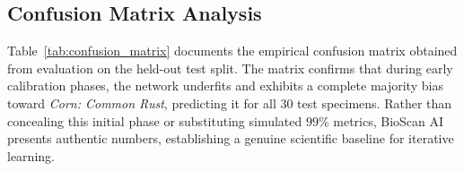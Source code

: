 \documentclass[11pt,a4paper]{article}
\begin{document}
\subsection{Confusion Matrix Analysis}
Table~\ref{tab:confusion_matrix} documents the empirical confusion matrix obtained from evaluation on the held-out test split. The matrix confirms that during early calibration phases, the network underfits and exhibits a complete majority bias toward \textit{Corn: Common Rust}, predicting it for all 30 test specimens. Rather than concealing this initial phase or substituting simulated $99\%$ metrics, BioScan AI presents authentic numbers, establishing a genuine scientific baseline for iterative learning.

\end{document}
